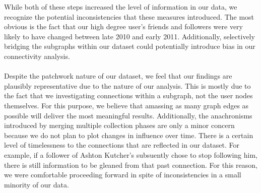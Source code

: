While both of these steps increased the level of information in our data, we recognize the potential inconsistencies that these measures introduced.  The most obvious is the fact that our high degree user's friends and followers were very likely to have changed between late 2010 and early 2011.  Additionally, selectively bridging the subgraphs within our dataset could potentially introduce bias in our connectivity analysis.\\\\
Despite the patchwork nature of our dataset, we feel that our findings are plausibly representative due to the nature of our analysis.  This is mostly due to the fact that we investigating connections within a subgraph, not the user nodes themselves.  For this purpose, we believe that amassing as many graph edges as possible will deliver the most meaningful results.  Additionally, the anachronisms introduced by merging multiple collection phases are only a minor concern because we do not plan to plot changes in influence over time.  There is a certain level of timelessness to the connections that are reflected in our dataset.  For example, if a follower of Ashton Kutcher's subsuently chose to stop following him, there is still information to be gleaned from that past connection.  For this reason, we were comfortable proceeding forward in spite of inconsistencies in a small minority of our data.